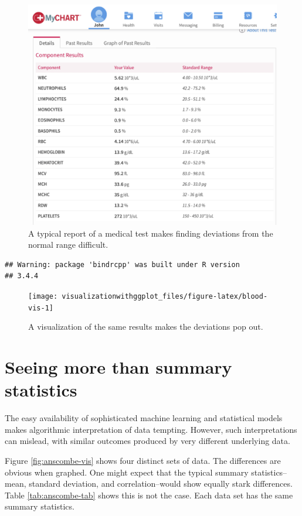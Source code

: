 \documentclass[]{krantz}
\theoremstyle{definition}
\theoremstyle{definition}
\theoremstyle{definition}
\theoremstyle{remark}
\begin{document}
\begin{figure}
\includegraphics[width=79.25in]{images/Blood_table} \caption{A typical report of a medical test makes finding deviations from the normal range difficult.}\label{fig:blood-tab}
\end{figure}

\begin{verbatim}
## Warning: package 'bindrcpp' was built under R version
## 3.4.4
\end{verbatim}

\begin{figure}
\texttt{[image: visualizationwithggplot\_files/figure-latex/blood-vis-1]} \caption{A visualization of the same results makes the deviations pop out.}\label{fig:blood-vis}
\end{figure}

\section{Seeing more than summary
statistics}\label{seeing-more-than-summary-statistics}

The easy availability of sophisticated machine learning and statistical
models makes algorithmic interpretation of data tempting. However, such
interpretations can mislead, with similar outcomes produced by very
different underlying data.

Figure \ref{fig:anscombe-vis} shows four distinct sets of data. The
differences are obvious when graphed. One might expect that the typical
summary statistics--mean, standard deviation, and correlation--would
show equally stark differences. Table \ref{tab:anscombe-tab} shows this
is not the case. Each data set has the same summary statistics.
\end{document}
